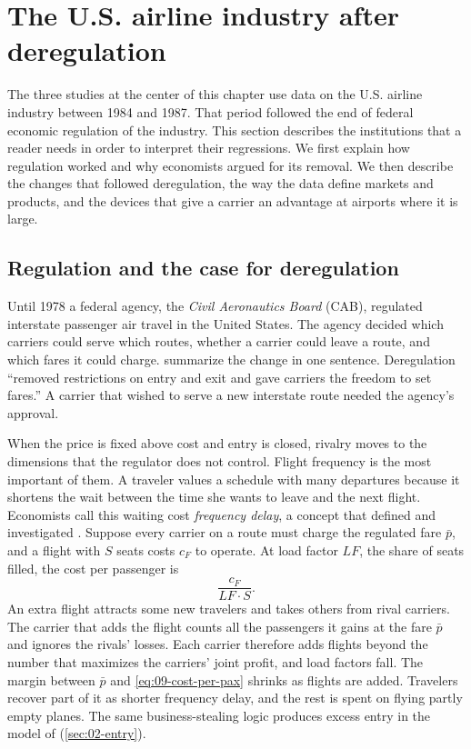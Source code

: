 \section{The U.S. airline industry after deregulation}\label{sec:09-industry}

The three studies at the center of this chapter use data on the U.S. airline industry between 1984 and 1987.
That period followed the end of federal economic regulation of the industry. This section describes the
institutions that a reader needs in order to interpret their regressions. We first explain how regulation
worked and why economists argued for its removal. We then describe the changes that followed deregulation,
the way the data define markets and products, and the devices that give a carrier an advantage at airports
where it is large.

\subsection{Regulation and the case for deregulation}\label{sec:09-regulation}

Until 1978 a federal agency, the \emph{Civil Aeronautics Board} (CAB), regulated interstate passenger air
travel in the United States. The agency decided which carriers could serve which routes, whether a carrier
could leave a route, and which fares it could charge. \citet[p.~1, n.~1]{BerryCarnallSpiller2006} summarize
the change in one sentence. Deregulation ``removed
restrictions on entry and exit and gave carriers the freedom to set fares.'' A carrier that wished to
serve a new interstate route needed the agency's approval.

When the price is fixed above cost and entry is closed, rivalry moves to the dimensions that the regulator
does not control. Flight frequency is the most important of them. A traveler values a schedule with many
departures because it shortens the wait between the time she wants to leave and the next flight. Economists
call this waiting cost \emph{frequency delay}, a concept that \citet{DouglasMiller1974} defined and
investigated \citep[p.~350]{Borenstein1989}. Suppose every carrier on a route must charge the regulated fare
$\bar p$, and a flight with $S$ seats costs $c_F$ to operate. At load factor $\mathit{LF}$, the share of
seats filled, the cost per passenger is
\begin{equation}\label{eq:09-cost-per-pax}
  \frac{c_F}{\mathit{LF}\cdot S}.
\end{equation}
An extra flight attracts some new travelers and takes others from rival carriers. The carrier that adds the
flight counts all the passengers it gains at the fare $\bar p$ and ignores the rivals' losses. Each carrier
therefore adds flights beyond the number that maximizes the carriers' joint profit, and load factors fall.
The margin between $\bar p$ and \eqref{eq:09-cost-per-pax} shrinks as flights are added. Travelers recover
part of it as shorter frequency delay, and the rest is spent on flying partly empty planes. The same
business-stealing logic produces excess entry in the model of \citet{MankiwWhinston1986}
(\cref{sec:02-entry}).


